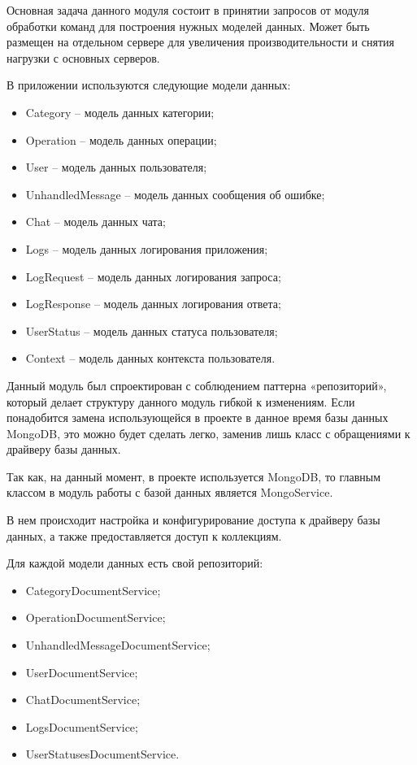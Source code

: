Основная задача данного модуля состоит в принятии запросов от модуля
обработки команд для построения нужных моделей данных. Может быть
размещен на отдельном сервере для увеличения производительности и снятия нагрузки с основных серверов.

В приложении используются следующие модели данных:

\begin{itemize}
	\item Category – модель данных категории;
	\item Operation – модель данных операции;
	\item User – модель данных пользователя;
	\item UnhandledMessage – модель данных сообщения об ошибке;
	\item Chat – модель данных чата;
	\item Logs – модель данных логирования приложения;
	\item LogRequest – модель данных логирования запроса;
	\item LogResponse – модель данных логирования ответа;
	\item UserStatus – модель данных статуса пользователя;
	\item Context – модель данных контекста пользователя.
\end{itemize}

Данный модуль был спроектирован с соблюдением паттерна «репозиторий», который делает структуру данного модуль гибкой к изменениям. Если понадобится замена использующейся в проекте в данное время базы данных MongoDB, это можно будет сделать легко, заменив лишь класс с обращениями к драйверу базы данных.

Так как, на данный момент, в проекте используется MongoDB, то главным классом в модуль работы с базой данных является MongoService.

В нем происходит настройка и конфигурирование доступа к драйверу базы данных, а также предоставляется доступ к коллекциям.

Для каждой модели данных есть свой репозиторий:

\begin{itemize}
	\item CategoryDocumentService;
	\item OperationDocumentService;
	\item UnhandledMessageDocumentService;
	\item UserDocumentService;
	\item ChatDocumentService;
	\item LogsDocumentService;
	\item UserStatusesDocumentService.
\end{itemize}

